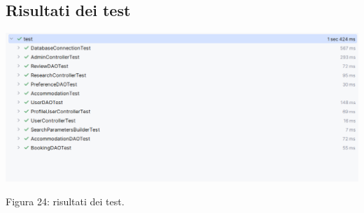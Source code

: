 \documentclass[10pt]{article}
\begin{document}
\subsection{Risultati dei test}
\par\medskip
\begin{center}
\includegraphics[scale=0.5]{test/BusinessLogic/risultatitest}
\par\medskip
Figura 24: risultati dei test.
\par\medskip
\end{center}
\end{document}
